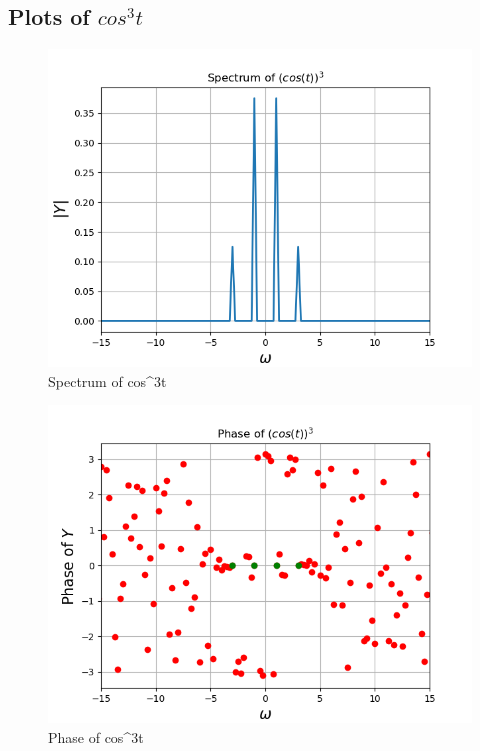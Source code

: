\documentclass[11pt]{article}
\begin{document}
\subsection{Plots of $cos^3t$}
\begin{figure}[H]
    \centering
    \includegraphics[scale = 0.75]{Figure_5a.png}
    \caption{Spectrum of cos^3t}
\end{figure}
\begin{figure}[H]
    \centering
    \includegraphics[scale = 0.75]{Figure_5b.png}
    \caption{Phase of cos^3t}
\end{figure}
\end{document}
